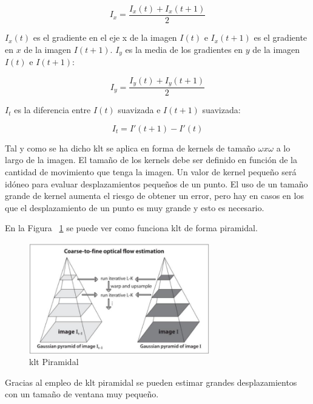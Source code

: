 \begin{equation}
    I_x = \frac{I_x(t)+I_x(t+1)}{2}
\end{equation}

$I_x(t)$ es el gradiente en el eje x de la imagen $I(t)$ e $I_x(t+1)$ es el gradiente en $x$ de la imagen $I(t+1)$. $I_y$ es la media de los gradientes en $y$ de la imagen $I(t)$ e $I(t+1)$:

\begin{equation}
    I_y = \frac{I_y(t)+I_y(t+1)}{2}
\end{equation}

$I_t$ es la diferencia entre $I(t)$ suavizada e $I(t+1)$ suavizada:

\begin{equation}
   I_t = I'(t+1) - I'(t) 
\end{equation}

Tal y como se ha dicho \acrshort{klt} se aplica en forma de kernels de tamaño $\omega x \omega$ a lo largo de la imagen. El tamaño de los kernels debe ser definido en función de la cantidad de movimiento que tenga la imagen. Un valor de kernel pequeño será idóneo para evaluar desplazamientos pequeños de un punto. El uso de un tamaño grande de kernel aumenta el riesgo de obtener un error, pero hay en casos en los que el desplazamiento de un punto es muy grande y esto es necesario.

En la Figura ~\ref{fig.klt_piramidal} se puede ver como funciona \acrshort{klt} de forma piramidal.

 \begin{figure}[H] 
\begin{center}
	\includegraphics[width=0.7\textwidth]{figures/Diseno_global/klt_piramidal.png}
   \caption{\acrshort{klt} Piramidal}
	\label{fig.klt_piramidal}
\end{center}
\end{figure}

Gracias al empleo de \acrshort{klt} piramidal se pueden estimar grandes desplazamientos con un tamaño de ventana muy pequeño.

